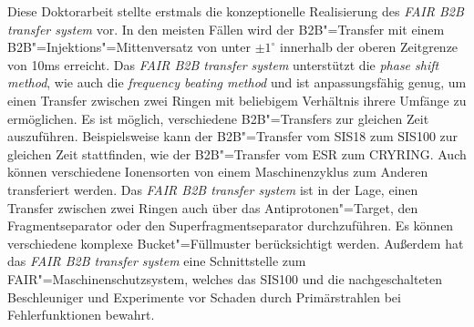 Diese Doktorarbeit stellte erstmals die konzeptionelle Realisierung des \textit{FAIR B2B transfer system} vor. 
In den meisten F\"allen wird der B2B"=Transfer mit einem B2B"=Injektions"=Mittenversatz von unter $\pm 1^\circ$ innerhalb der oberen Zeitgrenze von 10ms erreicht. Das \textit{FAIR B2B transfer system} unterst\"utzt die \textit{phase shift method}, wie auch die \textit{frequency beating method} und ist anpassungsf\"ahig genug, um einen Transfer zwischen zwei Ringen mit beliebigem Verh\"altnis ihrere Umf\"ange zu erm\"oglichen. Es ist m\"oglich, verschiedene B2B"=Transfers zur gleichen Zeit auszuf\"uhren. Beispielsweise kann der B2B"=Transfer vom SIS18 zum SIS100 zur gleichen Zeit stattfinden, wie der B2B"=Transfer vom ESR zum CRYRING. Auch k\"onnen verschiedene Ionensorten von einem Maschinenzyklus zum Anderen transferiert werden. Das \textit{FAIR B2B transfer system} ist in der Lage, einen Transfer zwischen zwei Ringen auch \"uber das Antiprotonen"=Target, den Fragmentseparator oder den Superfragmentseparator durchzuf\"uhren. Es k\"onnen verschiedene komplexe Bucket"=F\"ullmuster ber\"ucksichtigt werden. Au\ss{}erdem hat das \textit{FAIR B2B transfer system} eine Schnittstelle zum FAIR"=Maschinenschutzsystem, welches das SIS100 und die nachgeschalteten Beschleuniger und Experimente vor Schaden durch Prim\"arstrahlen bei Fehlerfunktionen bewahrt. 

